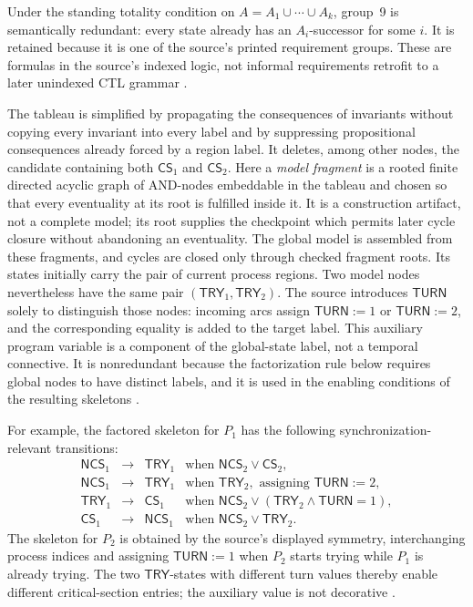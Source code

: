 Under the standing totality condition on
\(A=A_1\cup\cdots\cup A_k\), group~9 is semantically redundant: every state
already has an \(A_i\)-successor for some \(i\).  It is retained because it is
one of the source's printed requirement groups.
These are formulas in the source's indexed logic, not informal requirements
retrofit to a later unindexed CTL grammar
\cite[pp.~63--65]{ClarkeEmerson1981}.

The tableau is simplified by propagating the consequences of invariants
without copying every invariant into every label and by suppressing
propositional consequences already forced by a region label.  It deletes,
among other nodes, the candidate containing both
\(\mathsf{CS}_1\) and \(\mathsf{CS}_2\).  Here a \emph{model fragment} is a
rooted finite directed acyclic graph of AND-nodes embeddable in the tableau
and chosen so that every eventuality at its root is fulfilled inside it.  It
is a construction artifact, not a complete model; its root supplies the
checkpoint which permits later cycle closure without abandoning an
eventuality.  The global model is assembled from these fragments, and cycles
are closed only through checked fragment roots.  Its states initially
carry the pair of current process regions.  Two model nodes nevertheless have
the same pair
\((\mathsf{TRY}_1,\mathsf{TRY}_2)\).  The source introduces
\(\mathsf{TURN}\) solely to distinguish those nodes: incoming arcs assign
\(\mathsf{TURN}:=1\) or \(\mathsf{TURN}:=2\), and the corresponding equality
is added to the target label.  This auxiliary program variable is a component
of the global-state label, not a temporal connective.  It is nonredundant
because the factorization rule below requires global nodes to have distinct
labels, and it is used in the enabling conditions of the resulting skeletons
\cite[pp.~65--68]{ClarkeEmerson1981}.

For example, the factored skeleton for \(P_1\) has the following
synchronization-relevant transitions:
\[
\begin{array}{rcll}
 \mathsf{NCS}_1&\longrightarrow&\mathsf{TRY}_1
   &\text{when }\mathsf{NCS}_2\lor\mathsf{CS}_2,\\
 \mathsf{NCS}_1&\longrightarrow&\mathsf{TRY}_1
   &\text{when }\mathsf{TRY}_2,
     \text{ assigning }\mathsf{TURN}:=2,\\
 \mathsf{TRY}_1&\longrightarrow&\mathsf{CS}_1
   &\text{when }\mathsf{NCS}_2
     \lor(\mathsf{TRY}_2\land\mathsf{TURN}=1),\\
 \mathsf{CS}_1&\longrightarrow&\mathsf{NCS}_1
   &\text{when }\mathsf{NCS}_2\lor\mathsf{TRY}_2.
\end{array}
\]
The skeleton for \(P_2\) is obtained by the source's displayed symmetry,
interchanging process indices and assigning \(\mathsf{TURN}:=1\) when
\(P_2\) starts trying while \(P_1\) is already trying.  The two
\(\mathsf{TRY}\)-states with different turn values thereby enable different
critical-section entries; the auxiliary value is not decorative
\cite[pp.~67--69]{ClarkeEmerson1981}.

